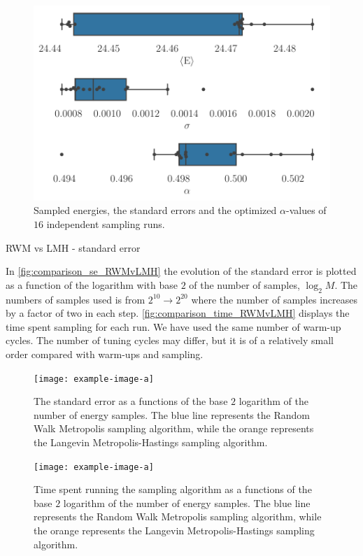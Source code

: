 \begin{figure}[H]
\begin{center}\includegraphics[scale=0.5]{latex/figures/aehoib_bp.pdf}
\end{center}
\caption{Sampled energies, the standard errors and the optimized $\alpha$-values of $16$ independent sampling runs.}
\label{fig:bp_aehoib}
\end{figure}

RWM vs LMH - standard error

In \autoref{fig:comparison_se_RWMvLMH} the evolution of the standard error is plotted as a function of the logarithm with base $2$ of the number of samples, $\log_2{M}$. The numbers of samples used is from $2^{10}\to2^{20}$ where the number of samples increases by a factor of two in each step. \autoref{fig:comparison_time_RWMvLMH} displays the time spent sampling for each run. We have used the same number of warm-up cycles. The number of tuning cycles may differ, but it is of a relatively small order compared with warm-ups and sampling. 

\begin{figure}[H]
\begin{center}\texttt{[image: example-image-a]}
\end{center}
\caption{The standard error as a functions of the base $2$ logarithm of the number of energy samples. The blue line represents the Random Walk Metropolis sampling algorithm, while the orange represents the Langevin Metropolis-Hastings sampling algorithm.}
\label{fig:comparison_se_RWMvLMH}
\end{figure}

\begin{figure}[H]
\begin{center}\texttt{[image: example-image-a]}
\end{center}
\caption{Time spent running the sampling algorithm as a functions of the base $2$ logarithm of the number of energy samples. The blue line represents the Random Walk Metropolis sampling algorithm, while the orange represents the Langevin Metropolis-Hastings sampling algorithm.}
\label{fig:comparison_time_RWMvLMH}
\end{figure}
